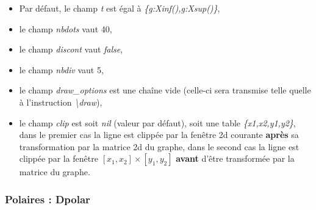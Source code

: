 \begin{itemize}
  \begin{itemize}
      \item Par défaut, le champ \emph{t} est égal à \emph{\{g:Xinf(),g:Xsup()\}},
      \item le champ \emph{nbdots} vaut 40, 
      \item le champ \emph{discont} vaut \emph{false},
      \item le champ \emph{nbdiv} vaut 5,
      \item le champ \emph{draw\_options} est une chaîne vide (celle-ci sera transmise telle quelle à l'instruction \emph{\textbackslash draw}),
      \item le champ \emph{clip} est soit \emph{nil} (valeur par défaut), soit une table \emph{\{x1,x2,y1,y2\}}, dans le premier cas la ligne est clippée par la fenêtre 2d courante \textbf{après} sa transformation par la matrice 2d du graphe, dans le second cas la ligne est clippée par la fenêtre $[x_1,x_2]\times[y_1,y_2]$ \textbf{avant} d'être transformée par la matrice du graphe.
  \end{itemize}
\end{itemize}  

\subsubsection{Polaires : Dpolar}

